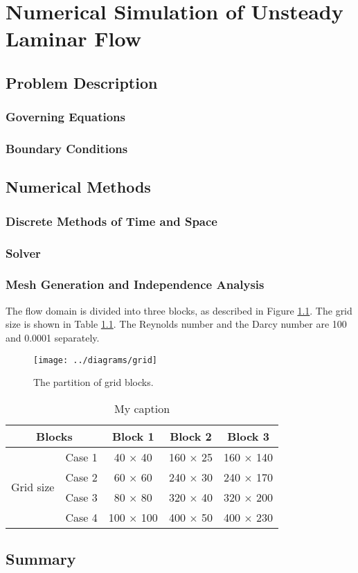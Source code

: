 \chapter{Numerical Simulation of Unsteady Laminar Flow}
\section{Problem Description}
\subsection{Governing Equations} %
\subsection{Boundary Conditions} %


\section{Numerical Methods}
\subsection{Discrete Methods of Time and Space}
\subsection{Solver} %
\subsection{Mesh Generation and Independence Analysis}
The flow domain is divided into three blocks, as described in Figure \ref{fig: grid}. The grid size is shown in Table \ref{tab: grid}. The Reynolds number and the Darcy number are 100 and 0.0001 separately.

\begin{figure}[H]
	\centering
	\texttt{[image: ../diagrams/grid]}
	\caption{The partition of grid blocks.}\label{fig: grid}
\end{figure}
\begin{table}[h]
	\centering
	\caption{My caption}
	\label{tab: grid}
	\begin{tabular}{@{}ccccc@{}}
		\toprule
		\multicolumn{2}{c}{Blocks}  & Block 1  & Block 2   & Block 3    \\ \midrule
		\multirow{4}{*}{Grid size} 
		& Case 1 & 40 $\times$ 40 & 160 $\times$ 25 & 160 $\times$ 140 \\
		& Case 2 & 60 $\times$ 60 & 240 $\times$ 30 & 240 $\times$ 170 \\
		& Case 3 & 80 $\times$ 80 & 320 $\times$ 40 & 320 $\times$ 200 \\
		& Case 4 & 100 $\times$ 100 & 400 $\times$ 50 & 400 $\times$ 230 \\
		\bottomrule
	\end{tabular}
\end{table}


\section{Summary}
